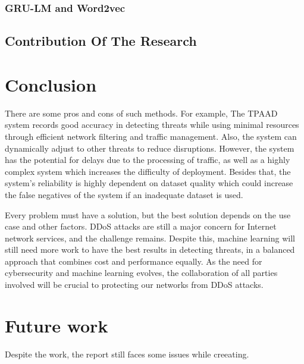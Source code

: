 \documentclass[a4paper, 12pt]{article}
\begin{document}
\subsubsection{GRU-LM and Word2vec}
\subsection{Contribution Of The Research}

\section{Conclusion}

There are some pros and cons of such methods. For example, The TPAAD system records good accuracy in detecting threats while using minimal resources through efficient network filtering and traffic management. Also, the system can dynamically adjust to other threats to reduce disruptions. However, the system has the potential for delays due to the processing of traffic, as well as a highly complex system which increases the difficulty of deployment. Besides that, the system's reliability is highly dependent on dataset quality which could increase the false negatives of the system if an inadequate dataset is used. 

Every problem must have a solution, but the best solution depends on the use case and other factors. DDoS attacks are still a major concern for Internet network services, and the challenge remains. Despite this, machine learning will still need more work to have the best results in detecting threats, in a balanced approach that combines cost and performance equally. As the need for cybersecurity and machine learning evolves, the collaboration of all parties involved will be crucial to protecting our networks from DDoS attacks. 

\section{Future work}
Despite the work, the report still faces some issues while creeating.
\end{document}
